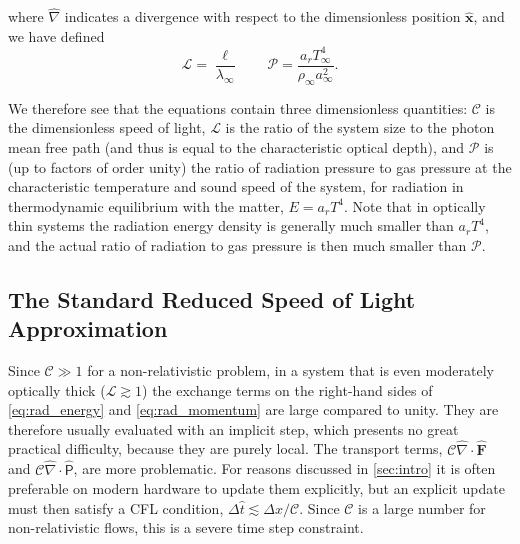 \documentclass[preprint,12pt,authoryear]{elsarticle}
\newcommand{\hatt}{\hat{t}}
\newcommand{\hnabla}{\hat{\nabla}}
\newcommand{\hx}{\hat{x}}
\newcommand{\hvecx}{\hat{\mathbf{x}}}
\newcommand{\hvecF}{\hat{\mathbf{F}}}
\newcommand{\htenP}{\hat{\mathsf{P}}}
\newcommand{\calC}{\mathcal{C}}
\newcommand{\calP}{\mathcal{P}}
\newcommand{\calL}{\mathcal{L}}
\begin{document}
where $\hnabla$ indicates a divergence with respect to the dimensionless position $\hvecx$, and we have defined
\begin{equation}
\calL = \frac{\ell}{\lambda_\infty} \qquad \calP = \frac{a_r T_\infty^4}{\rho_\infty a_\infty^2}.
\end{equation}

We therefore see that the equations contain three dimensionless quantities: $\calC$ is the dimensionless speed of light, $\calL$ is the ratio of the system size to the photon mean free path (and thus is equal to the characteristic optical depth), and $\calP$ is (up to factors of order unity) the ratio of radiation pressure to gas pressure at the characteristic temperature and sound speed of the system, for radiation in thermodynamic equilibrium with the matter, $E = a_r T^4$. Note that in optically thin systems the radiation energy density is generally much smaller than $a_r T^4$, and the actual ratio of radiation to gas pressure is then much smaller than $\calP$.

\subsection{The Standard Reduced Speed of Light Approximation}
\label{ssec:rsla}
\label{ssec:heat_capacity}

Since $\calC \gg 1$ for a non-relativistic problem, in a system that is even moderately optically thick ($\calL \gtrsim 1$) the exchange terms on the right-hand sides of \autoref{eq:rad_energy} and \autoref{eq:rad_momentum} are large compared to unity. They are therefore usually evaluated with an implicit step, which presents no great practical difficulty, because they are purely local. The transport terms, $\calC\hnabla\cdot\hvecF$ and $\calC\hnabla\cdot\htenP$, are more problematic. For reasons discussed in \autoref{sec:intro} it is often preferable on modern hardware to update them explicitly, but an explicit update must then satisfy a CFL condition, $\Delta\hatt \lesssim \Delta\hx/\calC$. Since $\calC$ is a large number for non-relativistic flows, this is a severe time step constraint.
\end{document}
